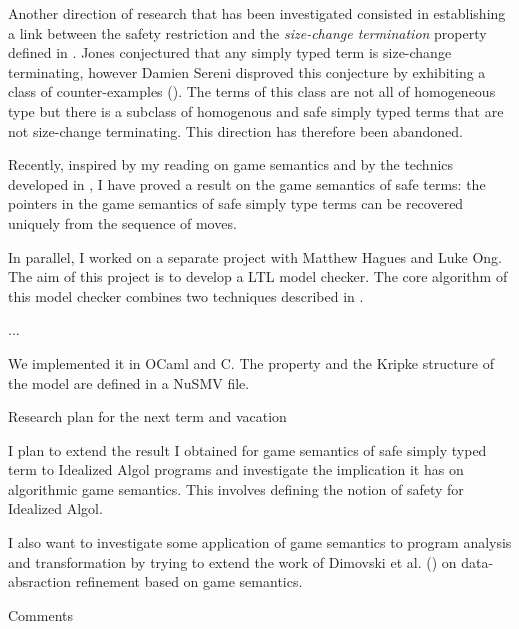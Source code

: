 \documentclass{article}
\begin{document}
\begin{list}
Another direction of research that has been investigated consisted
in establishing a link between the safety restriction and the
\emph{size-change termination} property defined in
\cite{jones01,jones04}. Jones conjectured that any simply typed term
is size-change terminating, however Damien Sereni disproved this
conjecture by exhibiting a class of counter-examples
(\cite{serenistypesct05}). The terms of this class are not all of
homogeneous type but there is a subclass of homogenous and safe
simply typed terms that are not size-change terminating. This
direction has therefore been abandoned.


Recently, inspired by my reading on game semantics
\cite{abramsky:game-semantics} and by the technics developed in
\cite{OngLics2006}, I have proved a result on the game semantics of
safe terms: the pointers in the game semantics of safe simply type
terms can be recovered uniquely from the sequence of moves.




In parallel, I worked on a separate project with Matthew Hagues and
Luke Ong. The aim of this project is to develop a LTL model checker.
The core algorithm of this model checker combines two techniques
described in \cite{DBLP:conf/cav/McMillan03, ckos2005,
hammer:truly}.

...

We implemented it in OCaml and C. The property and the Kripke
structure of the model are defined in a NuSMV file.




\item[Research plan for the next term and vacation] \

I plan to extend the result I obtained for game semantics of safe
simply typed term to Idealized Algol programs and investigate the
implication it has on algorithmic game semantics. This involves
defining the notion of safety for Idealized Algol.


I also want to investigate some application of game semantics to
program analysis and transformation by trying to extend the work of
Dimovski et al. (\cite{DBLP:conf/sas/DimovskiGL05}) on
data-absraction refinement based on game semantics.


\item[Comments]

\end{list}



\end{document}
